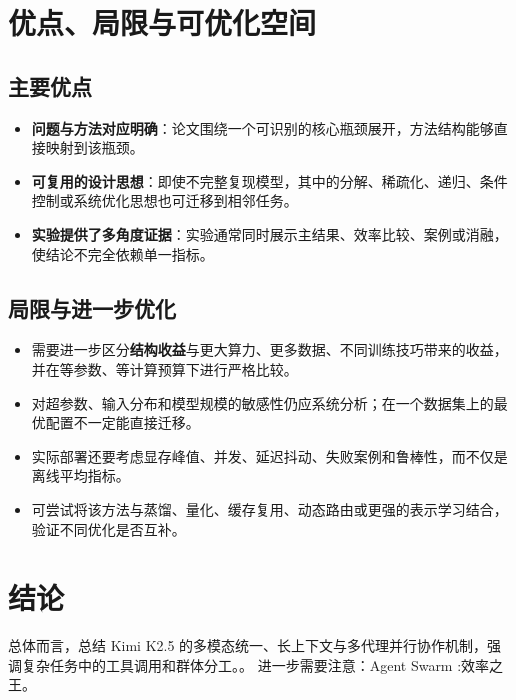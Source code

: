\documentclass[UTF8,11pt,a4paper]{ctexart}
\newcommand{\term}[1]{\textbf{\textcolor{mainblue}{#1}}}
\begin{document}
\section{优点、局限与可优化空间}
\subsection{主要优点}
\begin{itemize}
\item \term{问题与方法对应明确}：论文围绕一个可识别的核心瓶颈展开，方法结构能够直接映射到该瓶颈。
\item \term{可复用的设计思想}：即使不完整复现模型，其中的分解、稀疏化、递归、条件控制或系统优化思想也可迁移到相邻任务。
\item \term{实验提供了多角度证据}：实验通常同时展示主结果、效率比较、案例或消融，使结论不完全依赖单一指标。
\end{itemize}

\subsection{局限与进一步优化}
\begin{itemize}
\item 需要进一步区分\term{结构收益}与更大算力、更多数据、不同训练技巧带来的收益，并在等参数、等计算预算下进行严格比较。
\item 对超参数、输入分布和模型规模的敏感性仍应系统分析；在一个数据集上的最优配置不一定能直接迁移。
\item 实际部署还要考虑显存峰值、并发、延迟抖动、失败案例和鲁棒性，而不仅是离线平均指标。
\item 可尝试将该方法与蒸馏、量化、缓存复用、动态路由或更强的表示学习结合，验证不同优化是否互补。
\end{itemize}

\section{结论}
总体而言，总结 Kimi K2.5 的多模态统一、长上下文与多代理并行协作机制，强调复杂任务中的工具调用和群体分工。。 进一步需要注意：Agent Swarm :效率之王。
\end{document}
